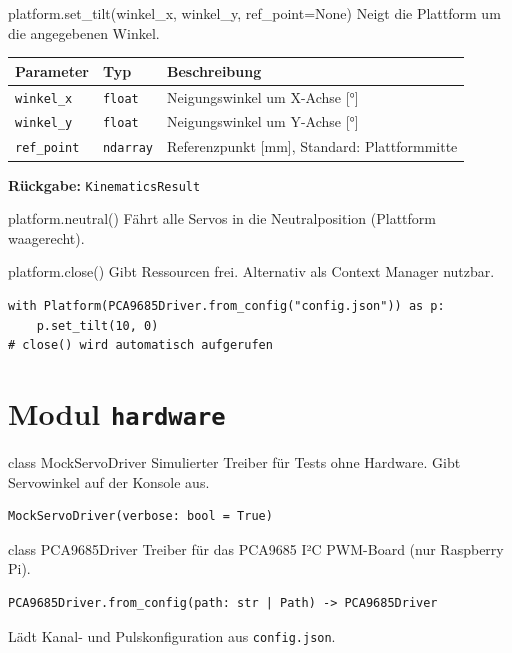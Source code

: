 \documentclass[11pt, a4paper]{scrartcl}
\newcommand{\apiparam}[3]{%
  \texttt{#1} & \texttt{\color{htbdark}#2} & #3 \\
}
\begin{document}
\begin{apibox}{platform.set\_tilt(winkel\_x, winkel\_y, ref\_point=None)}
  Neigt die Plattform um die angegebenen Winkel.

  \medskip
  \begin{tabular}{lll}
    \toprule
    Parameter & Typ & Beschreibung \\
    \midrule
    \apiparam{winkel\_x}{float}{Neigungswinkel um X-Achse [°]}
    \apiparam{winkel\_y}{float}{Neigungswinkel um Y-Achse [°]}
    \apiparam{ref\_point}{ndarray}{Referenzpunkt [mm], Standard: Plattformmitte}
    \bottomrule
  \end{tabular}

  \medskip
  \textbf{Rückgabe:} \texttt{KinematicsResult}
\end{apibox}

\begin{apibox}{platform.neutral()}
  Fährt alle Servos in die Neutralposition (Plattform waagerecht).
\end{apibox}

\begin{apibox}{platform.close()}
  Gibt Ressourcen frei. Alternativ als Context Manager nutzbar.
\end{apibox}

\begin{lstlisting}[caption={Context Manager}]
with Platform(PCA9685Driver.from_config("config.json")) as p:
    p.set_tilt(10, 0)
# close() wird automatisch aufgerufen
\end{lstlisting}

\section{Modul \texttt{hardware}}

\begin{apibox}{class MockServoDriver}
  Simulierter Treiber für Tests ohne Hardware. Gibt Servowinkel
  auf der Konsole aus.

  \begin{lstlisting}[numbers=none]
MockServoDriver(verbose: bool = True)
  \end{lstlisting}
\end{apibox}

\begin{apibox}{class PCA9685Driver}
  Treiber für das PCA9685 I²C PWM-Board (nur Raspberry Pi).

  \begin{lstlisting}[numbers=none]
PCA9685Driver.from_config(path: str | Path) -> PCA9685Driver
  \end{lstlisting}

  Lädt Kanal- und Pulskonfiguration aus \texttt{config.json}.
\end{apibox}
\end{document}
